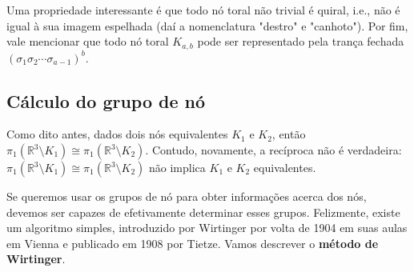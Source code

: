 \documentclass[a4paper,portuguese,11pt,twoside, leqno]{book}
\theoremstyle{definition}
\begin{document}
	\par\vspace{0.3cm} Uma propriedade interessante é que todo nó toral não trivial é quiral, i.e., não é igual à sua imagem espelhada (daí a nomenclatura "destro" e "canhoto"). Por fim, vale mencionar que todo nó toral $K_{a,b}$ pode ser representado pela trança fechada $(\sigma_1\sigma_2\cdots\sigma_{a-1})^b$.  
	
	\subsection{Cálculo do grupo de nó}
	\hspace{12pt} Como dito antes, dados dois nós equivalentes $K_1$ e $K_2$, então $\pi_1(\mathbb{R}^3\setminus K_1) \cong \pi_1(\mathbb{R}^3\setminus K_2)$. Contudo, novamente, a recíproca não é verdadeira: $\pi_1(\mathbb{R}^3\setminus K_1) \cong \pi_1(\mathbb{R}^3\setminus K_2)$ não implica $K_1$ e $K_2$ equivalentes. 
	\par\vspace{0.3cm} Se queremos usar os grupos de nó para obter informações acerca dos nós, devemos ser capazes de efetivamente determinar esses grupos. Felizmente, existe um algoritmo simples, introduzido por Wirtinger por volta de 1904 em suas aulas em Vienna e publicado em 1908 por Tietze. Vamos descrever o \textbf{método de Wirtinger}.
\end{document}
